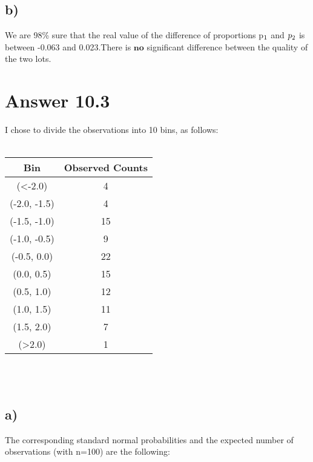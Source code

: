 \documentclass[12pt]{article}
\begin{document}
\subsection*{b)}
We are 98\% sure that the real value of the difference of proportions p$\textsubscript{1}$ and $p\textsubscript{2}$ is between -0.063 and 0.023.There is $\textbf{no}$ significant difference between the quality of the two lots.

\section*{Answer 10.3}
I chose to divide the observations into 10 bins, as follows: \\\\

\begin{tabular}{|c|c|}
\hline
\textbf{Bin}       & \multicolumn{1}{l|}{\textbf{Observed Counts}} \\ \hline
(\textless -2.0)   & 4                                             \\ \hline
(-2.0, -1.5)       & 4                                             \\ \hline
(-1.5, -1.0)       & 15                                            \\ \hline
(-1.0, -0.5)       & 9                                             \\ \hline
(-0.5, 0.0)        & 22                                            \\ \hline
(0.0, 0.5)         & 15                                            \\ \hline
(0.5, 1.0)         & 12                                            \\ \hline
(1.0, 1.5)         & 11                                            \\ \hline
(1.5, 2.0)         & 7                                             \\ \hline
(\textgreater 2.0) & 1                                             \\ \hline
\end{tabular}
\\\\

\subsection*{a)}

The corresponding standard normal probabilities and the expected number of observations (with n=100) are the following:\\\\
\end{document}
